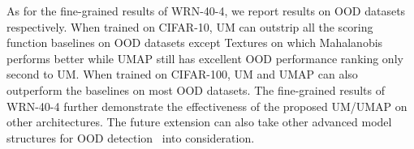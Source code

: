 \documentclass{article}
\theoremstyle{plain}
\theoremstyle{definition}
\theoremstyle{remark}
\begin{document}
\begin{table}[t!]
    \caption{Results of WRN-40-4. Comparison with competitive OOD detection baselines (). We respectively train WRN-40-4 on CIFAR-10 and CIFAR-100. For those methods involving outliers, we retrieve  samples from ImageNet-1k.  indicates higher values are better, and  indicates lower values are better.}
    \vspace{2mm}
\centering
    \footnotesize
    \label{tab:label_wrn}
\end{table}

As for the fine-grained results of WRN-40-4, we report results on  OOD datasets respectively. When trained on CIFAR-10, UM can outstrip all the scoring function baselines on  OOD datasets except Textures on which Mahalanobis performs better while UMAP still has excellent OOD performance ranking only second to UM. When trained on CIFAR-100, UM and UMAP can also outperform the baselines on most OOD datasets. The fine-grained results of WRN-40-4 further demonstrate the effectiveness of the proposed UM/UMAP on other architectures. The future extension can also take other advanced model structures for OOD detection~\citep{ming2022delving} into consideration. 
\end{document}
